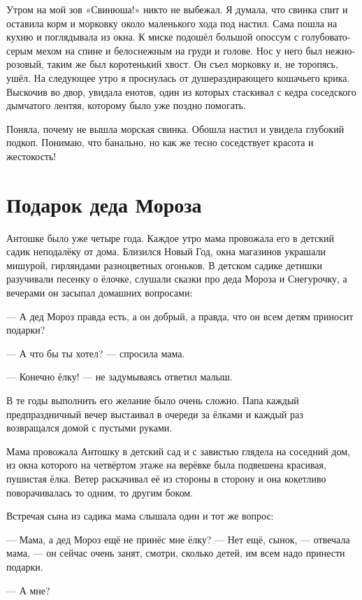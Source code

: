 Утром на мой зов «Свинюша!» никто не выбежал.
Я думала, что свинка спит и оставила корм и морковку около маленького хода под настил.
Сама пошла на кухню и поглядывала из окна.
К миске подошёл большой опоссум с голубовато-серым мехом на спине и белоснежным на груди и голове.
Нос у него был нежно-розовый, таким же был коротенький хвост.
Он съел морковку и, не торопясь, ушёл.
На следующее утро я проснулась от душераздирающего кошачьего крика.
Выскочив во двор, увидала енотов, один из которых стаскивал с кедра соседского дымчатого лентяя, которому было уже поздно помогать.

Поняла, почему не вышла морская свинка.
Обошла настил и увидела глубокий подкоп.
Понимаю, что банально, но как же тесно соседствует красота и жестокость!

\section*{Подарок деда Мороза}

Антошке было уже четыре года.
Каждое утро мама провожала его в детский садик неподалёку от дома.
Близился Новый Год, окна магазинов украшали мишурой, гирляндами разноцветных огоньков.
В детском садике детишки разучивали песенку о ёлочке, слушали сказки про деда Мороза и Снегурочку, а вечерами  он засыпал домашних вопросами:

--- А дед Мороз правда есть, а он добрый, а правда, что он всем детям приносит подарки?

--- А что бы ты хотел? --- спросила мама.

--- Конечно ёлку! --- не задумываясь ответил малыш.

В те годы выполнить его желание было очень сложно.
Папа каждый предпраздничный вечер выстаивал в очереди за ёлками и каждый раз возвращался домой с пустыми руками.

Мама провожала Антошку в детский сад и с завистью глядела на соседний дом, из окна которого на четвёртом этаже на верёвке была подвешена красивая, пушистая ёлка.
Ветер раскачивал её из стороны в сторону и она  кокетливо поворачивалась то одним, то другим боком.

Встречая сына из садика мама слышала один и тот же вопрос:

--- Мама, а дед Мороз ещё не принёс мне ёлку?
--- Нет ещё, сынок, --- отвечала мама, --- он сейчас очень занят, смотри, сколько детей, им всем  надо принести подарки.

--- А мне?

